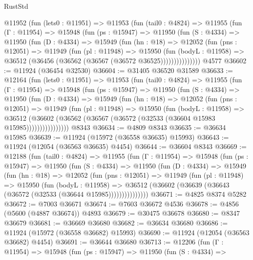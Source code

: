 \begin{lexlean}{RustStd}
\begin{coremodule}
{\begin{coremodule}
{{{{{{{{{{{{{{{{{{{{{{{{{{{{{{{{{{{{{{{{{{{{{{{{{{{{{{{{{{{{{{{{{{{{{{{{{{{{{{{{    @11952
      (fun (lets0 : @11951) =>
      @11953
        (fun (tail0 : @4824) =>
        @11955
          (fun (Γ : @11954) =>
          @15948
            (fun (ps : @15947) =>
            @11950
              (fun (S : @4334) =>
              @11950
                (fun (D : @4334) =>
                @15949
                  (fun (hn : @18) =>
                  @12052
                    (fun (pns : @12051) =>
                    @11949
                      (fun (pl : @11948) =>
                      @15950
                        (fun (bodyL : @11958) =>
                        @36512 (@36456 (@36562 (@36567 (@36572 @36525)))))))))))))))
    @4577
@36602 := @11924 (@36454 @32530)
@36604 := @31405 @36520 @31589
@36633 := @12164
    (fun (lets0 : @11951) =>
    @11953
      (fun (tail0 : @4824) =>
      @11955
        (fun (Γ : @11954) =>
        @15948
          (fun (ps : @15947) =>
          @11950
            (fun (S : @4334) =>
            @11950
              (fun (D : @4334) =>
              @15949
                (fun (hn : @18) =>
                @12052
                  (fun (pns : @12051) =>
                  @11949
                    (fun (pl : @11948) =>
                    @15950
                      (fun (bodyL : @11958) =>
                      @36512
                        (@36602
                          (@36562 (@36567 (@36572 (@32533 (@36604 @15983 @15985))))))))))))))))
    @8343
@36634 := @4809 @8343
@36635 := @36634 @15985
@36639 := @11924 (@15972 (@36558 @36635) @15993)
@36643 := @11924 (@12054 (@36563 @36635) @4454)
@36644 := @36604 @8343
@36669 := @12188
    (fun (tail0 : @4824) =>
    @11955
      (fun (Γ : @11954) =>
      @15948
        (fun (ps : @15947) =>
        @11950
          (fun (S : @4334) =>
          @11950
            (fun (D : @4334) =>
            @15949
              (fun (hn : @18) =>
              @12052
                (fun (pns : @12051) =>
                @11949
                  (fun (pl : @11948) =>
                  @15950
                    (fun (bodyL : @11958) =>
                    @36512 (@36602 (@36639 (@36643 (@36572 (@32533 (@36644 @15985)))))))))))))))
@36671 := @4825 @8374 @5282
@36672 := @7003 @36671
@36674 := @7603 @36672 @4536
@36678 := @4856 (@5600 (@4887 @36674)) @4893
@36679 := @30475 @36678
@36680 := @8347 @36679
@36681 := @36669 @36680
@36682 := @36634 @36680
@36686 := @11924 (@15972 (@36558 @36682) @15993)
@36690 := @11924 (@12054 (@36563 @36682) @4454)
@36691 := @36644 @36680
@36713 := @12206
    (fun (Γ : @11954) =>
    @15948
      (fun (ps : @15947) =>
      @11950
        (fun (S : @4334) =>
}}}}}}}}}}}}}}}}}}}}}}}}}}}}}}}}}}}}}}}}}}}}}}}}}}}}}}}}}}}}}}}}}}}}}}}}}}}}}}}}
\end{coremodule}}
\end{coremodule}
\end{lexlean}
